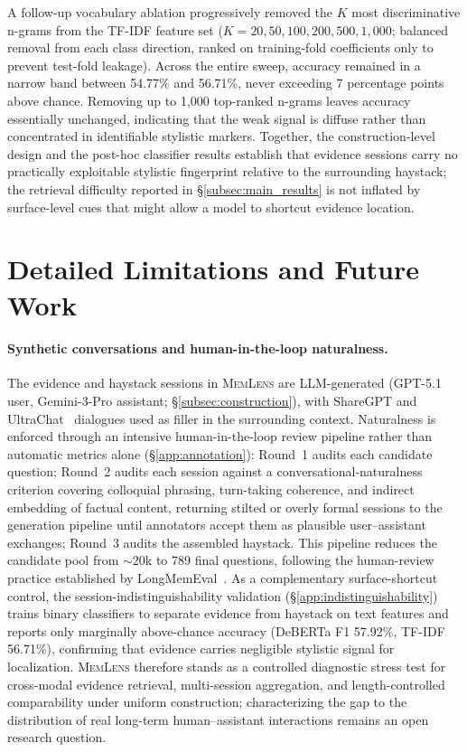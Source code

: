 \documentclass{article}
\newcommand{\bench}{\textsc{MemLens}}
\begin{document}
A follow-up vocabulary ablation progressively removed the $K$ most discriminative n-grams from the TF-IDF feature set ($K = 20, 50, 100, 200, 500, 1{,}000$; balanced removal from each class direction, ranked on training-fold coefficients only to prevent test-fold leakage). Across the entire sweep, accuracy remained in a narrow band between 54.77\% and 56.71\%, never exceeding 7 percentage points above chance. Removing up to 1{,}000 top-ranked n-grams leaves accuracy essentially unchanged, indicating that the weak signal is diffuse rather than concentrated in identifiable stylistic markers. Together, the construction-level design and the post-hoc classifier results establish that evidence sessions carry no practically exploitable stylistic fingerprint relative to the surrounding haystack; the retrieval difficulty reported in \S\ref{subsec:main_results} is not inflated by surface-level cues that might allow a model to shortcut evidence location.


\section{Detailed Limitations and Future Work}
\label{app:limitations}

\paragraph{Synthetic conversations and human-in-the-loop naturalness.}
The evidence and haystack sessions in \bench{} are LLM-generated (GPT-5.1 user, Gemini-3-Pro assistant; \S\ref{subsec:construction}), with ShareGPT and UltraChat~\cite{ding2023enhancing} dialogues used as filler in the surrounding context. Naturalness is enforced through an intensive human-in-the-loop review pipeline rather than automatic metrics alone (\S\ref{app:annotation}): Round~1 audits each candidate question; Round~2 audits each session against a conversational-naturalness criterion covering colloquial phrasing, turn-taking coherence, and indirect embedding of factual content, returning stilted or overly formal sessions to the generation pipeline until annotators accept them as plausible user--assistant exchanges; Round~3 audits the assembled haystack. This pipeline reduces the candidate pool from ${\sim}20$k to 789 final questions, following the human-review practice established by LongMemEval~\cite{wu2025longmemevalbenchmarkingchatassistants}. As a complementary surface-shortcut control, the session-indistinguishability validation (\S\ref{app:indistinguishability}) trains binary classifiers to separate evidence from haystack on text features and reports only marginally above-chance accuracy (DeBERTa F1 57.92\%, TF-IDF 56.71\%), confirming that evidence carries negligible stylistic signal for localization. \bench{} therefore stands as a controlled diagnostic stress test for cross-modal evidence retrieval, multi-session aggregation, and length-controlled comparability under uniform construction; characterizing the gap to the distribution of real long-term human--assistant interactions remains an open research question.
\end{document}
